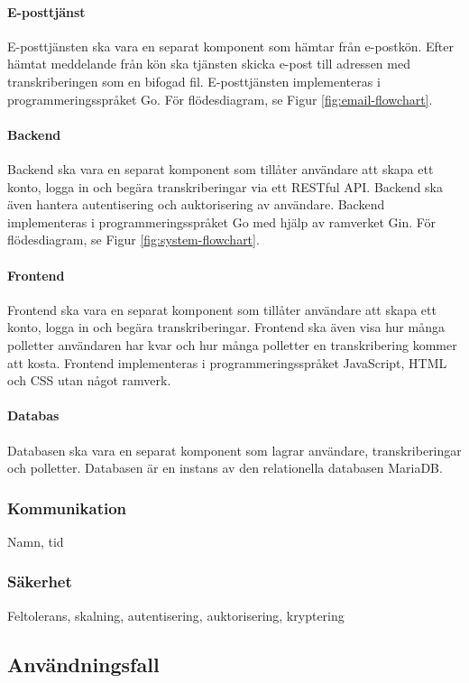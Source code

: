 \paragraph{E-posttjänst}
E-posttjänsten ska vara en separat komponent som hämtar från e-postkön. Efter
hämtat meddelande från kön ska tjänsten skicka e-post till adressen med
transkriberingen som en bifogad fil. E-posttjänsten implementeras i 
programmeringsspråket Go. För flödesdiagram, se Figur \ref{fig:email-flowchart}.

\paragraph{Backend}
Backend ska vara en separat komponent som tillåter användare att skapa ett
konto, logga in och begära transkriberingar via ett RESTful API. Backend ska
även hantera autentisering och auktorisering av användare. Backend implementeras
i programmeringsspråket Go med hjälp av ramverket Gin. För flödesdiagram, se Figur \ref{fig:system-flowchart}.

\paragraph{Frontend}
Frontend ska vara en separat komponent som tillåter användare att skapa ett
konto, logga in och begära transkriberingar. Frontend ska även visa hur
många polletter användaren har kvar och hur många polletter en transkribering
kommer att kosta. Frontend implementeras i programmeringsspråket JavaScript,
HTML och CSS utan något ramverk.

\paragraph{Databas}
Databasen ska vara en separat komponent som lagrar användare, transkriberingar
och polletter. Databasen är en instans av den relationella databasen MariaDB.

\subsubsection{Kommunikation}
Namn, tid

\subsubsection{Säkerhet}
Feltolerans, skalning, autentisering, auktorisering, kryptering

\subsection{Användningsfall}

